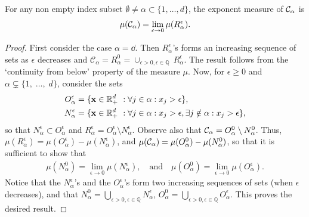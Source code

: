 \begin{lemma}\label{jmva:lem:limit_muCalphaEps}
For any non empty index subset $\emptyset \neq \alpha\subset\{1,\ldots,d\}$, the exponent measure of
$\mathcal{C}_\alpha$ is
\[
\mu(\mathcal{C}_\alpha) = \lim_{\epsilon\to 0} \mu(R_\alpha^\epsilon).
\]
\end{lemma}
\begin{proof}
First consider the case $\alpha=\dd$. Then $R_\alpha^\epsilon$'s forms an increasing sequence of sets as $\epsilon$ decreases and $\mathcal{C}_\alpha = R_\alpha^0 = \cup_{\epsilon>0, \epsilon \in \mathbb{Q}}~R_\alpha^\epsilon$. The result follows from the `continuity from below' property of the measure $\mu$. 
Now, for $\epsilon\ge 0$ and $\alpha\subsetneq\{1,\; \ldots,\; d\}$, consider the sets
\begin{align}
O_\alpha^\epsilon &  =\{ \mathbf x \in\mathbb{R}_+^d~: \forall j \in \alpha:x_j > \epsilon \},  \nonumber \\
N_\alpha^\epsilon &  =\{\mathbf x \in\mathbb{R}_+^d~: \forall j \in \alpha:   x_j > \epsilon, \exists j \notin\alpha: x_j > \epsilon \}, \nonumber
\end{align}
so that $N_\alpha^\epsilon \subset O_\alpha^\epsilon$ and $R_\alpha^\epsilon  = O_\alpha^\epsilon \setminus N_\alpha^\epsilon$. Observe also that $\mathcal{C}_\alpha = O_\alpha^0\setminus N_\alpha^0$. Thus, $\mu(R_\alpha^\epsilon) = \mu(O_\alpha^\epsilon) - \mu(N_\alpha^\epsilon)$, and $\mu(\mathcal{C}_\alpha) = \mu(O_\alpha^0) - \mu(N_\alpha^0)$,  so that it is sufficient to show that 
\begin{align}
\mu(N_\alpha^0) = \lim_{\epsilon\to 0}\mu(N_\alpha^\epsilon) ,
\quad \text{and}  \quad
\mu(O_\alpha^0) = \lim_{\epsilon\to 0}\mu(O_\alpha^\epsilon). \nonumber
\end{align}
Notice that the $N_\alpha^\epsilon$'s and the $O_\alpha^\epsilon$'s form two increasing sequences of sets (when $\epsilon$ decreases), and that  $N_\alpha^0 = \bigcup_{\epsilon>0,\epsilon\in\mathbb{Q}} N_\alpha^\epsilon$, $O_\alpha^0 = \bigcup_{\epsilon>0,\epsilon\in\mathbb{Q}} O_\alpha^\epsilon$. This proves the desired result.
\end{proof}



